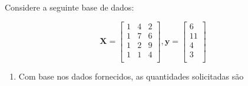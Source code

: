\documentclass[
  11pt,
]{article}
\begin{document}
Considere a seguinte base de dados:

\[\mathbf{X}=
\begin{bmatrix} 
  1 &   4 &  2 \\
  1 &   7 &  6 \\
  1 &   2 &  9  \\
  1 &   1 &  4  \\
  \end{bmatrix}, 
% 
\mathbf{y}=
\begin{bmatrix} 
    6  \\
    11 \\
    4  \\
    3 \\
\end{bmatrix}\]

\begin{enumerate}
\def\labelenumi{\arabic{enumi}.}
\item
  Com base nos dados fornecidos, as quantidades solicitadas são


\end{enumerate}
\end{document}
